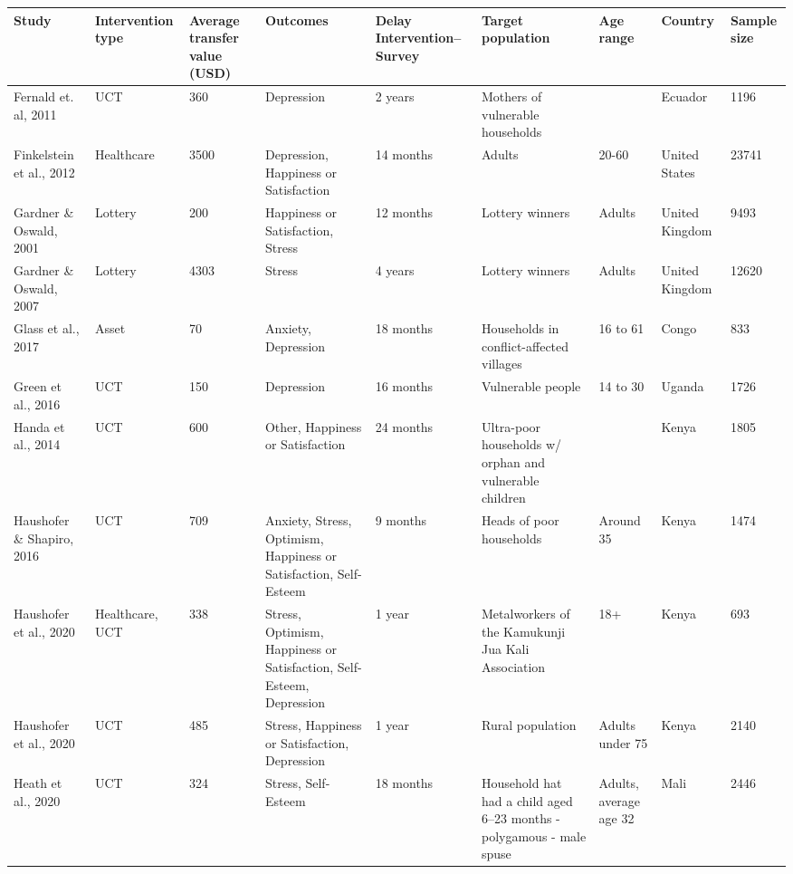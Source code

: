 \begin{table}[ht]
\centering
\begingroup\scriptsize
\begin{tabular}{p{1.8cm}p{1.7cm}p{1.3 cm}p{2cm}p{1.7cm}p{2.0cm}p{1cm}p{1.2cm}p{1cm}}
  \hline
{\textbf{Study}} & {\textbf{Intervention type}} & {\textbf{Average transfer value (USD)}} & {\textbf{Outcomes}} & {\textbf{Delay Intervention--Survey}} & {\textbf{Target 
 population}} & {\textbf{Age 
 range}} & {\textbf{Country}} & {\textbf{Sample 
 size}} \\ 
  \hline
Fernald et. al, 2011 & UCT & 360 & Depression & 2 years & Mothers of vulnerable households &  & Ecuador & 1196 \\ 
   \hline
Finkelstein et al., 2012 & Healthcare & 3500 & Depression, Happiness or Satisfaction & 14 months & Adults & 20-60 & United States & 23741 \\ 
   \hline
Gardner \& Oswald, 2001 & Lottery & 200 & Happiness or Satisfaction, Stress & 12 months & Lottery winners & Adults & United Kingdom & 9493 \\ 
   \hline
Gardner \& Oswald, 2007 & Lottery & 4303 & Stress & 4 years & Lottery winners & Adults & United Kingdom & 12620 \\ 
   \hline
Glass et al., 2017 & Asset & 70 & Anxiety, Depression & 18 months & Households in conflict-affected villages & 16 to 61 & Congo & 833 \\ 
   \hline
Green et al., 2016 & UCT & 150 & Depression & 16 months & Vulnerable people & 14 to 30 & Uganda & 1726 \\ 
   \hline
Handa et al., 2014 & UCT & 600 & Other, Happiness or Satisfaction & 24 months & Ultra-poor households w/ orphan and vulnerable children &  & Kenya & 1805 \\ 
   \hline
Haushofer \& Shapiro, 2016 & UCT & 709 & Anxiety, Stress, Optimism, Happiness or Satisfaction, Self-Esteem & 9 months & Heads of poor households & Around 35 & Kenya & 1474 \\ 
   \hline
Haushofer et al., 2020 & Healthcare, UCT & 338 & Stress, Optimism, Happiness or Satisfaction, Self-Esteem, Depression & 1 year & Metalworkers of the Kamukunji Jua Kali Association & 18+ & Kenya & 693 \\ 
   \hline
Haushofer et al., 2020 & UCT & 485 & Stress, Happiness or Satisfaction, Depression & 1 year & Rural population & Adults under 75 & Kenya & 2140 \\ 
   \hline
Heath et al., 2020 & UCT & 324 & Stress, Self-Esteem & 18 months & Household hat had a child aged 6–23 months - polygamous - male spuse & Adults, average age 32 & Mali & 2446 \\ 

\end{tabular}
\end{table}
